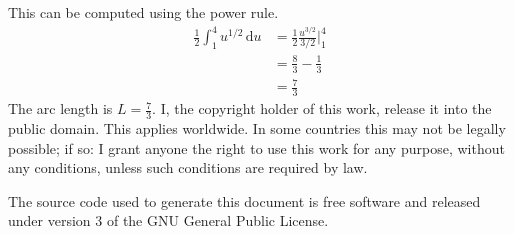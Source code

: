 \documentclass{article}
\begin{document}
        This can be computed using the power rule.
        \begin{subequations}
            \begin{align}
                \frac{1}{2}\int_{1}^{4}u^{1/2}\,\textrm{d}u
                &=\frac{1}{2}\frac{u^{3/2}}{3/2}\Big|_{1}^{4}\\
                &=\frac{8}{3}-\frac{1}{3}\\
                &=\frac{7}{3}
            \end{align}
        \end{subequations}
        The arc length is $L=\frac{7}{3}$.
        \color{black}
    \fi
    \newpage
    I, the copyright holder of this work, release it into the public domain.
    This applies worldwide. In some countries this may not be legally possible;
    if so: I grant anyone the right to use this work for any purpose, without
    any conditions, unless such conditions are required by law.
    \par\hfill\par
    The source code used to generate this document is free software and released
    under version 3 of the GNU General Public License.
\end{document}
